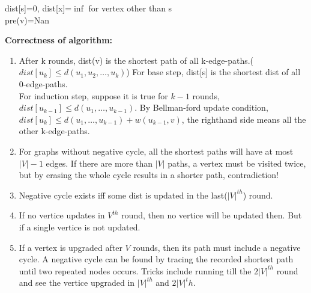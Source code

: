 \begin{algorithm}
    dist[s]=0, dist[x]=$\inf$ for vertex other than s\\
    pre(v)=Nan\\
\end{algorithm}
\textbf{Correctness of algorithm:}
\begin{enumerate}
    \item After k rounds, dist(v) is the shortest path of all k-edge-paths.($dist[u_k]\leq d(u_1,u_2,\ldots,u_k)$)
    For base step, dist[s] is the shortest dist of all 0-edge-paths.\\
    For induction step, suppose it is true for $k-1$ rounds, $dist[u_{k-1}] \leq d(u_1,\ldots,u_{k-1})$. By Bellman-ford update condition, $dist[u_{k}]\leq d(u_1,\ldots,u_{k-1})+w(u_{k-1},v)$, the righthand side means all the other k-edge-paths.
    \item For graphs without negative cycle, all the shortest paths will have at most $|V|-1$ edges.
    If there are more than $|V|$ paths, a vertex must be visited twice, but by erasing the whole cycle results in a shorter path, contradiction!
    \item Negative cycle exists iff some dist is updated in the last($|V|^{th}$) round.
    \item If no vertice updates in $V^{th}$ round, then no vertice will be updated then. But if a single vertice is not updated.
    \item If a vertex is upgraded after $V$ rounds, then its path must include a negative cycle.
    A negative cycle can be found by tracing the recorded shortest path until two repeated nodes occurs. Tricks include running till the $2|V|^{th}$ round and see the vertice upgraded in $|V|^{th}$ and $2|V|^th$.
\end{enumerate}
